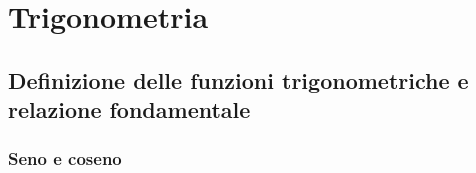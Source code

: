\documentclass[letterpaper,10pt,english]{jupyterBook}
\begin{document}
\chapter{Trigonometria}
\label{\detokenize{ch/trigonometry:trigonometria}}\label{\detokenize{ch/trigonometry:math-hs-trigonometry}}\label{\detokenize{ch/trigonometry::doc}}

\section{Definizione delle funzioni trigonometriche e relazione fondamentale}
\label{\detokenize{ch/trigonometry:definizione-delle-funzioni-trigonometriche-e-relazione-fondamentale}}

\subsection{Seno e coseno}
\end{document}
